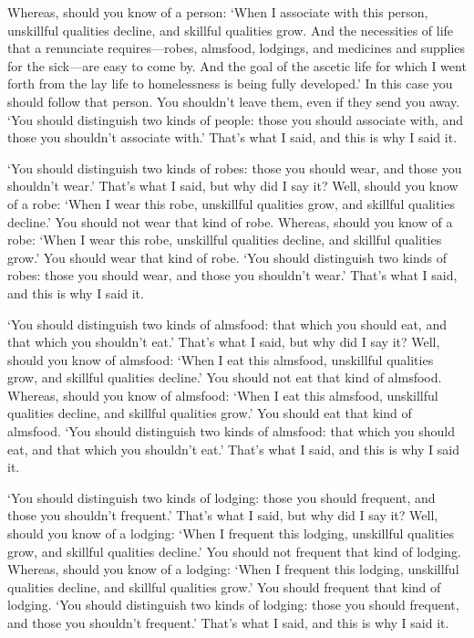 \documentclass[12pt,openany]{book}%
\begin{document}
Whereas, should you know of a person: ‘When I associate with this person, unskillful qualities decline, and skillful qualities grow. And the necessities of life that a renunciate requires—robes, almsfood, lodgings, and medicines and supplies for the sick—are easy to come by. And the goal of the ascetic life for which I went forth from the lay life to homelessness is being fully developed.’ In this case you should follow that person. You shouldn’t leave them, even if they send you away. ‘You should distinguish two kinds of people: those you should associate with, and those you shouldn’t associate with.’ That’s what I said, and this is why I said it. 

‘You should distinguish two kinds of robes: those you should wear, and those you shouldn’t wear.’ That’s what I said, but why did I say it? Well, should you know of a robe: ‘When I wear this robe, unskillful qualities grow, and skillful qualities decline.’ You should not wear that kind of robe. Whereas, should you know of a robe: ‘When I wear this robe, unskillful qualities decline, and skillful qualities grow.’ You should wear that kind of robe. ‘You should distinguish two kinds of robes: those you should wear, and those you shouldn’t wear.’ That’s what I said, and this is why I said it. 

‘You should distinguish two kinds of almsfood: that which you should eat, and that which you shouldn’t eat.’ That’s what I said, but why did I say it? Well, should you know of almsfood: ‘When I eat this almsfood, unskillful qualities grow, and skillful qualities decline.’ You should not eat that kind of almsfood. Whereas, should you know of almsfood: ‘When I eat this almsfood, unskillful qualities decline, and skillful qualities grow.’ You should eat that kind of almsfood. ‘You should distinguish two kinds of almsfood: that which you should eat, and that which you shouldn’t eat.’ That’s what I said, and this is why I said it. 

‘You should distinguish two kinds of lodging: those you should frequent, and those you shouldn’t frequent.’ That’s what I said, but why did I say it? Well, should you know of a lodging: ‘When I frequent this lodging, unskillful qualities grow, and skillful qualities decline.’ You should not frequent that kind of lodging. Whereas, should you know of a lodging: ‘When I frequent this lodging, unskillful qualities decline, and skillful qualities grow.’ You should frequent that kind of lodging. ‘You should distinguish two kinds of lodging: those you should frequent, and those you shouldn’t frequent.’ That’s what I said, and this is why I said it. 
\end{document}
